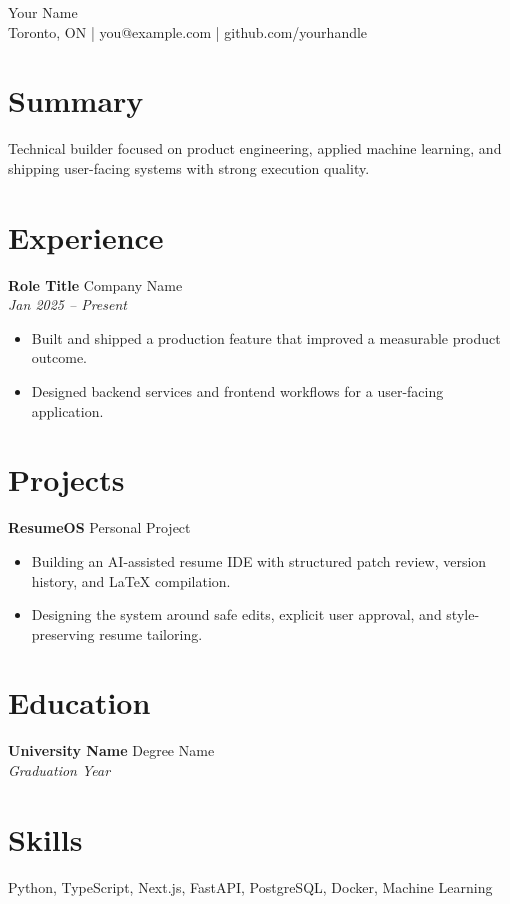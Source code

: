 \documentclass[11pt]{article}
\begin{document}
\begin{center}
    {\LARGE Your Name} \\
    Toronto, ON \quad | \quad you@example.com \quad | \quad github.com/yourhandle
\end{center}

\section*{Summary}
Technical builder focused on product engineering, applied machine learning, and shipping user-facing systems with strong execution quality.

\section*{Experience}
\textbf{Role Title} \hfill Company Name \\
\textit{Jan 2025 -- Present}
\begin{itemize}
    \item Built and shipped a production feature that improved a measurable product outcome.
    \item Designed backend services and frontend workflows for a user-facing application.
\end{itemize}

\section*{Projects}
\textbf{ResumeOS} \hfill Personal Project \\
\begin{itemize}
    \item Building an AI-assisted resume IDE with structured patch review, version history, and LaTeX compilation.
    \item Designing the system around safe edits, explicit user approval, and style-preserving resume tailoring.
\end{itemize}

\section*{Education}
\textbf{University Name} \hfill Degree Name \\
\textit{Graduation Year}

\section*{Skills}
Python, TypeScript, Next.js, FastAPI, PostgreSQL, Docker, Machine Learning
\end{document}
